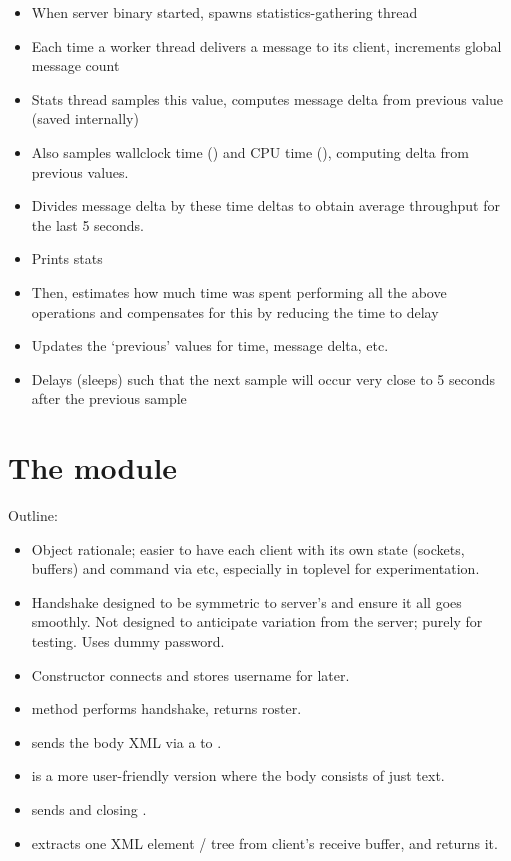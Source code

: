 \begin{itemize}
  \item When server binary started, spawns statistics-gathering thread
  \item Each time a worker thread delivers a message to its client, increments global message count
  \item Stats thread samples this value, computes message delta from previous value (saved internally)
  \item Also samples wallclock time () and CPU time (), computing delta from previous values.
  \item Divides message delta by these time deltas to obtain average throughput for the last 5 seconds.
  \item Prints stats
  \item Then, estimates how much time was spent performing all the above operations and compensates for this by reducing the time to delay
  \item Updates the `previous' values for time, message delta, etc.
  \item Delays (sleeps) such that the next sample will occur very close to 5 seconds after the previous sample
\end{itemize}

\section{The  module}\label{sec:mod-client}
Outline:

\begin{itemize}
  \item Object rationale; easier to have each client with its own state (sockets, buffers) and command via  etc, especially in toplevel for experimentation.

  \item Handshake designed to be symmetric to server's and ensure it all goes smoothly. Not designed to anticipate variation from the server; purely for testing. Uses dummy password.

  \item Constructor  connects and stores username for later.

  \item {} method performs handshake, returns roster.

  \item {} sends the body XML via a  to .

  \item {} is a more user-friendly version where the body consists of just text.

  \item {} sends  and closing .

  \item {} extracts one XML element / tree from client's receive buffer, and returns it.

\end{itemize}
